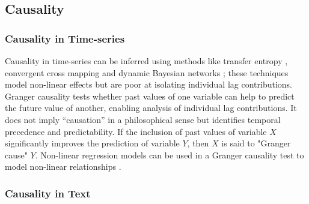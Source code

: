 \subsection{Causality}
\label{sec:causality}

\subsubsection{Causality in Time-series}
\label{sec:caus_in_TS}

Causality in time-series can be inferred using methods like transfer entropy \cite{barnett2009granger}, convergent cross mapping \cite{ye2015distinguishing} and dynamic Bayesian networks \cite{ghahramani1997learning}; these techniques model non-linear effects but are poor at isolating individual lag contributions. Granger causality \cite{702ab909-8cb1-3c30-a5f1-ab4517d6cf1c} tests whether past values of one variable can help to predict the future value of another, enabling analysis of individual lag contributions. It does not imply “causation” in a philosophical sense but identifies temporal precedence and predictability. If the inclusion of past values of variable $X$ significantly improves the prediction of variable $Y$, then $X$ is said to "Granger cause" $Y$. Non-linear regression models can be used in a Granger causality test to model non-linear relationships \cite{marinazzo2008kernel}.
\vspace{-0.1cm}

\subsubsection{Causality in Text}
\label{sec:cause_in_text}

